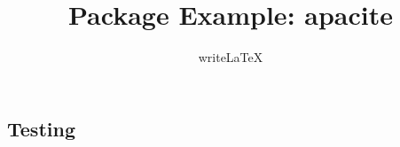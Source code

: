 \documentclass{article}
\title{Package Example: apacite}
\author{writeLaTeX}
\begin{document}
\subsection{Testing}
\end{document}
